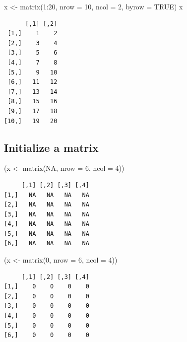 \documentclass[
]{book}
\newenvironment{Shaded}{\begin{snugshade}}{\end{snugshade}}
\newcommand{\AttributeTok}[1]{\textcolor[rgb]{0.77,0.63,0.00}{#1}}
\newcommand{\ConstantTok}[1]{\textcolor[rgb]{0.00,0.00,0.00}{#1}}
\newcommand{\DecValTok}[1]{\textcolor[rgb]{0.00,0.00,0.81}{#1}}
\newcommand{\FunctionTok}[1]{\textcolor[rgb]{0.00,0.00,0.00}{#1}}
\newcommand{\NormalTok}[1]{#1}
\newcommand{\OtherTok}[1]{\textcolor[rgb]{0.56,0.35,0.01}{#1}}
\newcommand{\SpecialCharTok}[1]{\textcolor[rgb]{0.00,0.00,0.00}{#1}}
\begin{document}
\begin{Shaded}
\begin{Highlighting}[]
\NormalTok{x }\OtherTok{\textless{}{-}} \FunctionTok{matrix}\NormalTok{(}\DecValTok{1}\SpecialCharTok{:}\DecValTok{20}\NormalTok{, }\AttributeTok{nrow =} \DecValTok{10}\NormalTok{, }\AttributeTok{ncol =} \DecValTok{2}\NormalTok{, }\AttributeTok{byrow =} \ConstantTok{TRUE}\NormalTok{)}
\NormalTok{x}
\end{Highlighting}
\end{Shaded}

\begin{verbatim}
      [,1] [,2]
 [1,]    1    2
 [2,]    3    4
 [3,]    5    6
 [4,]    7    8
 [5,]    9   10
 [6,]   11   12
 [7,]   13   14
 [8,]   15   16
 [9,]   17   18
[10,]   19   20
\end{verbatim}

\hypertarget{initialize-a-matrix}{%
\subsection{Initialize a matrix}\label{initialize-a-matrix}}

\begin{Shaded}
\begin{Highlighting}[]
\NormalTok{(x }\OtherTok{\textless{}{-}} \FunctionTok{matrix}\NormalTok{(}\ConstantTok{NA}\NormalTok{, }\AttributeTok{nrow =} \DecValTok{6}\NormalTok{, }\AttributeTok{ncol =} \DecValTok{4}\NormalTok{))}
\end{Highlighting}
\end{Shaded}

\begin{verbatim}
     [,1] [,2] [,3] [,4]
[1,]   NA   NA   NA   NA
[2,]   NA   NA   NA   NA
[3,]   NA   NA   NA   NA
[4,]   NA   NA   NA   NA
[5,]   NA   NA   NA   NA
[6,]   NA   NA   NA   NA
\end{verbatim}

\begin{Shaded}
\begin{Highlighting}[]
\NormalTok{(x }\OtherTok{\textless{}{-}} \FunctionTok{matrix}\NormalTok{(}\DecValTok{0}\NormalTok{, }\AttributeTok{nrow =} \DecValTok{6}\NormalTok{, }\AttributeTok{ncol =} \DecValTok{4}\NormalTok{))}
\end{Highlighting}
\end{Shaded}

\begin{verbatim}
     [,1] [,2] [,3] [,4]
[1,]    0    0    0    0
[2,]    0    0    0    0
[3,]    0    0    0    0
[4,]    0    0    0    0
[5,]    0    0    0    0
[6,]    0    0    0    0
\end{verbatim}
\end{document}
